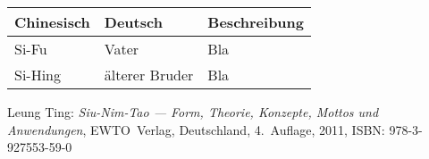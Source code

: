 \glsaddall%
\cleardoublepage
{}
\printglossaries


\begin{center}
	\begin{tabular}{l|l|l}
		\textbf{Chinesisch}	& \textbf{Deutsch}	& \textbf{Beschreibung} \\ \hline \hline
		Si-Fu				& Vater				& Bla \\ \hline
		Si-Hing				& \"alterer Bruder	& Bla \\
	\end{tabular}
\end{center}




\cleardoublepage
{}

\printindex






\begin{thebibliography}{99}

		Leung Ting:
		\emph{Siu-Nim-Tao --- Form, Theorie, Konzepte, Mottos und Anwendungen},
		EWTO~Verlag, Deutschland,
		4.~Auflage,
		2011,
		ISBN: 978-3-927553-59-0

\end{thebibliography}



